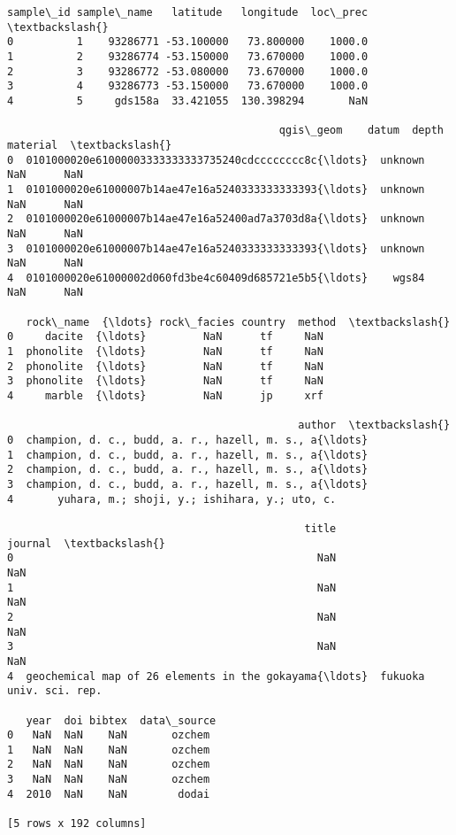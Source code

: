 \documentclass[11pt]{article}
\makeatletter
\newcommand{\boxspacing}{\kern\kvtcb@left@rule\kern\kvtcb@boxsep}
\newcommand{\prompt}[4]{
        {\ttfamily\llap{{\color{#2}[#3]:\hspace{3pt}#4}}\vspace{-\baselineskip}}
    }
\makeatother
\begin{document}
            \begin{tcolorbox}[breakable, size=fbox, boxrule=.5pt, pad at break*=1mm, opacityfill=0]
\prompt{Out}{outcolor}{20}{\boxspacing}
\begin{Verbatim}[commandchars=\\\{\}]
   sample\_id sample\_name   latitude   longitude  loc\_prec  \textbackslash{}
0          1    93286771 -53.100000   73.800000    1000.0
1          2    93286774 -53.150000   73.670000    1000.0
2          3    93286772 -53.080000   73.670000    1000.0
3          4    93286773 -53.150000   73.670000    1000.0
4          5     gds158a  33.421055  130.398294       NaN

                                           qgis\_geom    datum  depth material  \textbackslash{}
0  0101000020e61000003333333333735240cdcccccccc8c{\ldots}  unknown    NaN      NaN
1  0101000020e61000007b14ae47e16a5240333333333393{\ldots}  unknown    NaN      NaN
2  0101000020e61000007b14ae47e16a52400ad7a3703d8a{\ldots}  unknown    NaN      NaN
3  0101000020e61000007b14ae47e16a5240333333333393{\ldots}  unknown    NaN      NaN
4  0101000020e61000002d060fd3be4c60409d685721e5b5{\ldots}    wgs84    NaN      NaN

   rock\_name  {\ldots} rock\_facies country  method  \textbackslash{}
0     dacite  {\ldots}         NaN      tf     NaN
1  phonolite  {\ldots}         NaN      tf     NaN
2  phonolite  {\ldots}         NaN      tf     NaN
3  phonolite  {\ldots}         NaN      tf     NaN
4     marble  {\ldots}         NaN      jp     xrf

                                              author  \textbackslash{}
0  champion, d. c., budd, a. r., hazell, m. s., a{\ldots}
1  champion, d. c., budd, a. r., hazell, m. s., a{\ldots}
2  champion, d. c., budd, a. r., hazell, m. s., a{\ldots}
3  champion, d. c., budd, a. r., hazell, m. s., a{\ldots}
4       yuhara, m.; shoji, y.; ishihara, y.; uto, c.

                                               title                  journal  \textbackslash{}
0                                                NaN                      NaN
1                                                NaN                      NaN
2                                                NaN                      NaN
3                                                NaN                      NaN
4  geochemical map of 26 elements in the gokayama{\ldots}  fukuoka univ. sci. rep.

   year  doi bibtex  data\_source
0   NaN  NaN    NaN       ozchem
1   NaN  NaN    NaN       ozchem
2   NaN  NaN    NaN       ozchem
3   NaN  NaN    NaN       ozchem
4  2010  NaN    NaN        dodai

[5 rows x 192 columns]
\end{Verbatim}
\end{tcolorbox}
        
\end{document}
